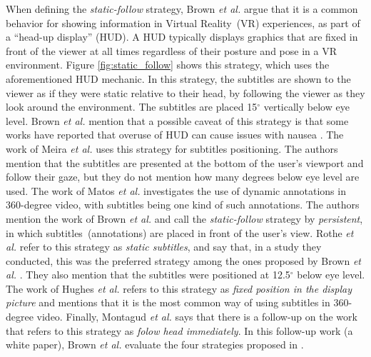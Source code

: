 When defining the \emph{static-follow} strategy, Brown \emph{et al.} \cite{brown_subtitles_2017} argue that it is a common behavior for showing information in Virtual Reality~(VR) experiences, as part of a ``head-up display'' (HUD). A HUD typically displays graphics that are fixed in front of the viewer at all times regardless of their posture and pose in a VR environment. Figure \ref{fig:static_follow} shows this strategy, which uses the aforementioned HUD mechanic. In this strategy, the subtitles are shown to the viewer as if they were static relative to their head, by following the viewer as they look around the environment. The subtitles are placed 15$^{\circ}$ vertically below eye level. Brown \emph{et al.} \cite{brown_subtitles_2017} mention that a possible caveat of this strategy is that some works have reported that overuse of HUD can cause issues with nausea \cite{laviola2000discussion, sharples2008virtual}.
The work of Meira \emph{et al.} \cite{meira_video_2016} uses this strategy for subtitles positioning. The authors mention that the subtitles are presented at the bottom of the user's viewport and follow their gaze, but they do not mention how many degrees below eye level are used. The work of Matos \emph{et al.} \cite{matos_dynamic_2018} investigates the use of dynamic annotations in 360-degree video, with subtitles being one kind of such annotations. The authors mention the work of Brown \emph{et al.} \cite{brown_subtitles_2017} and call the \emph{static-follow} strategy by \emph{persistent}, in which subtitles~(annotations) are placed in front of the user's view. Rothe \emph{et al.} \cite{rothe_dynamic_2018} refer to this strategy as \emph{static subtitles}, and say that, in a study they conducted, this was the preferred strategy among the ones proposed by Brown \emph{et al.} \cite{brown_subtitles_2017}. They also mention that the subtitles were positioned at 12.5$^{\circ}$ below eye level. The work of Hughes \emph{et al.} \cite{hughes_disruptive_2019} refers to this strategy as \emph{fixed position in the display picture} and mentions that it is the most common way of using subtitles in 360-degree video. Finally, Montagud \emph{et al.} \cite{montagud_culture_2020} says that there is a follow-up on the work \cite{brown_subtitles_2017} that refers to this strategy as \emph{folow head immediately}. In this follow-up work (a white paper), Brown \emph{et al.} \cite{brown2018exploring} evaluate the four strategies proposed in \cite{brown_subtitles_2017}. 


